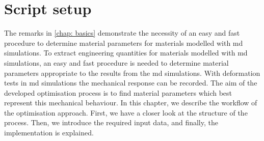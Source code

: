 




\chapter{Script setup} \label{chap:modelsAndMethods}

The remarks in \autoref{chap: basics} demonstrate the necessity of an easy and fast procedure to determine material parameters for materials modelled with \acrshort{md} simulations. 
To extract engineering quantities for materials modelled with \acrshort{md} simulations, an easy and fast procedure is needed to determine material parameters appropriate to the results from the \acrshort{md} simulations.
With deformation tests in \acrshort{md} simulations the mechanical response can be recorded. The aim of the developed optimisation process is to find material parameters which best represent this mechanical behaviour.
In this chapter, we describe the workflow of the optimisation approach. First, we have a closer look at the structure of the process. Then, we introduce the required input data, and finally, the implementation is explained. \\

